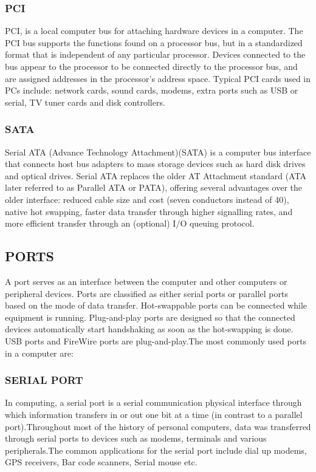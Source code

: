 \documentclass[a4paper,28pt]{report}
\begin{document}
\subsubsection*{PCI}
	  PCI, is a local computer bus for attaching hardware devices in a computer. The PCI bus supports the
	  functions found on a processor bus, but in a standardized format that is independent of any particular
	  processor. Devices connected to the bus appear to the processor to be connected directly to the processor
	  bus, and are assigned addresses in the processor's address space. Typical PCI cards used in PCs include: network 			cards, sound
	  cards, modems, extra ports such as USB or serial, TV tuner cards and disk controllers.
\subsubsection*{SATA}
	   Serial ATA (Advance Technology Attachment)(SATA) is a computer bus interface that
	   connects host bus adapters to mass storage devices such as hard disk drives and optical drives. Serial ATA
	   replaces the older AT Attachment standard (ATA later referred to as Parallel ATA or PATA), offering
	   several advantages over the older interface: reduced cable size and cost (seven conductors instead of 40),
	   native hot swapping, faster data transfer through higher signalling rates, and more efficient transfer through
	   an (optional) I/O queuing protocol.
\subsection*{PORTS}
	   A port serves as an interface between the computer and other computers or peripheral devices. Ports are classified 		as either serial ports or parallel ports
	   based on the mode of data transfer. Hot-swappable ports can be connected while equipment is running. Plug-and-play 		ports are designed so that the connected
	   devices automatically start handshaking as soon as the hot-swapping is done. USB ports and FireWire ports are
	   plug-and-play.The most commonly used ports in a computer are:
\subsubsection*{SERIAL PORT}
	    In computing, a serial port is a serial communication physical interface through which
	    information transfers in or out one bit at a time (in contrast to a parallel port).Throughout most of the
	    history of personal computers, data was transferred through serial ports to devices such as modems,
	    terminals and various peripherals.The common applications for the serial port include
	    dial up modems, GPS receivers, Bar code scanners, Serial mouse etc.
\end{document}
